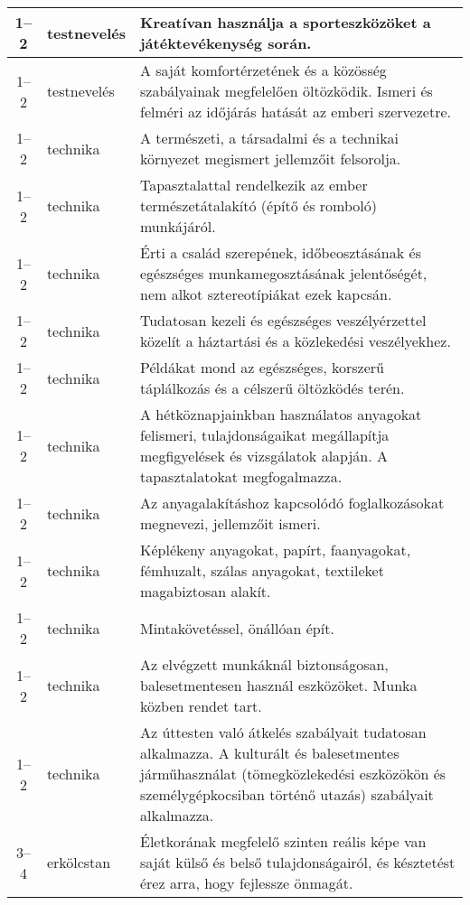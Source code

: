 \begin{small}
\begin{longtable}{c | p{2cm} |  p{11cm} }
              1--2 & testnevelés & Kreatívan használja a sporteszközöket a játéktevékenység során. \\ \hline
              1--2 & testnevelés & A saját komfortérzetének és a közösség szabályainak megfelelően öltözködik. Ismeri és felméri az időjárás hatását az emberi szervezetre. \\ \hline
              1--2 & technika & A természeti, a társadalmi és a technikai környezet megismert jellemzőit felsorolja. \\ \hline
              1--2 & technika & Tapasztalattal rendelkezik az ember természetátalakító (építő és romboló) munkájáról. \\ \hline
              1--2 & technika & Érti a család szerepének, időbeosztásának és egészséges munkamegosztásának jelentőségét, nem alkot sztereotípiákat ezek kapcsán. \\ \hline
              1--2 & technika & Tudatosan kezeli és egészséges veszélyérzettel közelít a háztartási és a közlekedési veszélyekhez. \\ \hline
              1--2 & technika & Példákat mond az egészséges, korszerű táplálkozás és a célszerű öltözködés terén. \\ \hline
              1--2 & technika & A hétköznapjainkban használatos anyagokat felismeri, tulajdonságaikat megállapítja megfigyelések és vizsgálatok alapján. A tapasztalatokat megfogalmazza. \\ \hline
              1--2 & technika & Az anyagalakításhoz kapcsolódó foglalkozásokat megnevezi, jellemzőit ismeri. \\ \hline
              1--2 & technika & Képlékeny anyagokat, papírt, faanyagokat, fémhuzalt, szálas anyagokat, textileket magabiztosan alakít. \\ \hline
              1--2 & technika & Mintakövetéssel, önállóan épít. \\ \hline
              1--2 & technika & Az elvégzett munkáknál biztonságosan, balesetmentesen használ eszközöket. Munka közben rendet tart. \\ \hline
              1--2 & technika & Az úttesten való átkelés szabályait tudatosan alkalmazza. A kulturált és balesetmentes járműhasználat (tömegközlekedési eszközökön és személygépkocsiban történő utazás) szabályait alkalmazza. \\ \hline
              3--4 & erkölcstan & Életkorának megfelelő szinten reális képe van saját külső és belső tulajdonságairól, és késztetést érez arra, hogy fejlessze önmagát. \\ \hline

\end{longtable}
\end{small}

